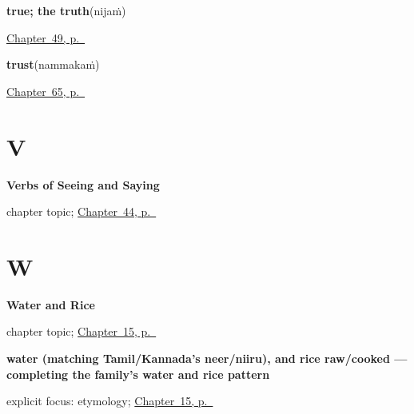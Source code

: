 \noindent\begin{minipage}[t]{\linewidth}
\raggedright
\textbf{true; the truth}\enspace\emph{}\enspace(nijaṁ)\par
\footnotesize \hyperref[ch:te-replies]{Chapter~49, p.~\pageref*{ch:te-replies}}
\end{minipage}\par\smallskip

\noindent\begin{minipage}[t]{\linewidth}
\raggedright
\textbf{trust}\enspace\emph{}\enspace(nammakaṁ)\par
\footnotesize \hyperref[ch:te-more-manners]{Chapter~65, p.~\pageref*{ch:te-more-manners}}
\end{minipage}\par\smallskip

\section*{V}

\noindent\begin{minipage}[t]{\linewidth}
\raggedright
\textbf{Verbs of Seeing and Saying}\par
\footnotesize chapter topic; \hyperref[ch:te-see-say]{Chapter~44, p.~\pageref*{ch:te-see-say}}
\end{minipage}\par\smallskip

\section*{W}

\noindent\begin{minipage}[t]{\linewidth}
\raggedright
\textbf{Water and Rice}\par
\footnotesize chapter topic; \hyperref[ch:te-water-and-rice]{Chapter~15, p.~\pageref*{ch:te-water-and-rice}}
\end{minipage}\par\smallskip

\noindent\begin{minipage}[t]{\linewidth}
\raggedright
\textbf{water (matching Tamil/Kannada's neer/niiru), and rice raw/cooked — completing the family's water and rice pattern}\enspace\emph{  }\par
\footnotesize explicit focus: etymology; \hyperref[ch:te-water-and-rice]{Chapter~15, p.~\pageref*{ch:te-water-and-rice}}
\end{minipage}\par\smallskip

